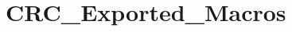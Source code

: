 \hypertarget{group___c_r_c___exported___macros}{}\section{C\+R\+C\+\_\+\+Exported\+\_\+\+Macros}
\label{group___c_r_c___exported___macros}
